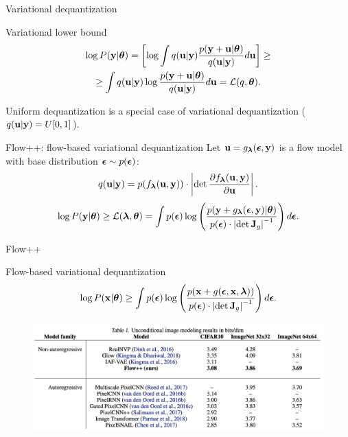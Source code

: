 \documentclass{beamer}
\begin{document}
\begin{frame}{Variational dequantization}
	\vspace{-0.2cm}
	\begin{block}{Variational lower bound}
		\vspace{-0.7cm}
		\begin{multline*}
			\log P(\mathbf{y} | \boldsymbol{\theta}) = \left[ \log \int q(\mathbf{u} | \mathbf{y}) \frac{p(\mathbf{y} + \mathbf{u} | \boldsymbol{\theta})}{q(\mathbf{u} | \mathbf{y})} d \mathbf{u} \right] \geq \\ 
			\geq  \int q(\mathbf{u} | \mathbf{y}) \log \frac{p(\mathbf{y} + \mathbf{u} | \boldsymbol{\theta})}{q(\mathbf{u} | \mathbf{y})} d \mathbf{u} = \mathcal{L}(q, \boldsymbol{\theta}).
		\end{multline*}
		\vspace{-0.6cm}
	\end{block}
	Uniform dequantization is a special case of variational dequantization ($q(\mathbf{u} | \mathbf{y}) = U[0, 1]$).
	\begin{block}{Flow++: flow-based variational dequantization}
		Let $\mathbf{u} = g_{\boldsymbol{\lambda}}(\boldsymbol{\epsilon}, \mathbf{y})$ is a flow model with base distribution $\boldsymbol{\epsilon} \sim p(\boldsymbol{\epsilon})$:
		\vspace{-0.3cm}
		\[
		q(\mathbf{u} | \mathbf{y}) = p(f_{\boldsymbol{\lambda}}(\mathbf{u}, \mathbf{y})) \cdot \left| \det \frac{\partial f_{\boldsymbol{\lambda}}(\mathbf{u}, \mathbf{y})}{\partial \mathbf{u}}\right|.
		\]
		\vspace{-0.3cm}
		\[
		\log P(\mathbf{y} | \boldsymbol{\theta}) \geq \mathcal{L}(\boldsymbol{\lambda}, \boldsymbol{\theta}) = \int p(\boldsymbol{\epsilon}) \log \left( \frac{p(\mathbf{y} + g_{\boldsymbol{\lambda}}(\boldsymbol{\epsilon}, \mathbf{y}) | \boldsymbol{\theta})}{p(\boldsymbol{\epsilon}) \cdot \left| \det \mathbf{J}_g\right|^{-1}} \right) d\boldsymbol{\epsilon}.
		\]
		\vspace{-0.3cm}
	\end{block}
\end{frame}
\begin{frame}{Flow++}
	\begin{block}{Flow-based variational dequantization}
		\vspace{-0.3cm}
		\[
		\log P(\mathbf{x} | \boldsymbol{\theta}) \geq \int p(\boldsymbol{\epsilon})\log \left( \frac{p(\mathbf{x} + g(\boldsymbol{\epsilon}, \mathbf{x}, \boldsymbol{\lambda}))}{p(\boldsymbol{\epsilon}) \cdot \left| \det \mathbf{J}_g\right|^{-1}} \right) d\boldsymbol{\epsilon}.
		\]
	\end{block}
	\begin{figure}
		\centering
		\includegraphics[width=\linewidth]{figs/flow++1.png}
	\end{figure}
	\vspace{-0.1cm}
\end{frame}
\end{document}
